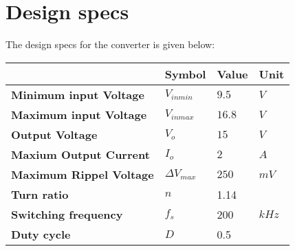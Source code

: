 \section{Design specs}
The design specs for the converter is given below:
\begin{table}[h!]
\begin{center}
\begin{tabular}{|l|l|l|l|}
\hline
\textbf{}                         & \textbf{Symbol}            & \textbf{Value} & \textbf{Unit} \\ \hline
\textbf{Minimum input   Voltage}  & \textbf{$V_{inmin}$}       & \textbf{$9.5$}     & \textbf{$V$}      \\ \hline
\textbf{Maximum input   Voltage}  & \textbf{$V_{inmax}$}       & \textbf{$16.8$}    & \textbf{$V$}      \\ \hline
\textbf{Output Voltage}           & \textbf{$V_o$}             & \textbf{$15$}      & \textbf{$V$}      \\ \hline
\textbf{Maxium Output Current}    & \textbf{$I_o$}             & \textbf{$2$}       & \textbf{$A$}      \\ \hline
\textbf{Maximum Rippel   Voltage} & \textbf{$\Delta V_{max}$}  & \textbf{$250$}     & \textbf{$mV$}     \\ \hline
\textbf{Turn ratio}               & $n$                        &  1.14              &                   \\ \hline
\textbf{Switching frequency}      & \textbf{$f_s$}             & 200                & \textbf{$kHz$}    \\ \hline
\textbf{Duty cycle}               & \textbf{$D$}               & 0.5                &                   \\ \hline
\end{tabular}
\end{center}
\end{table}